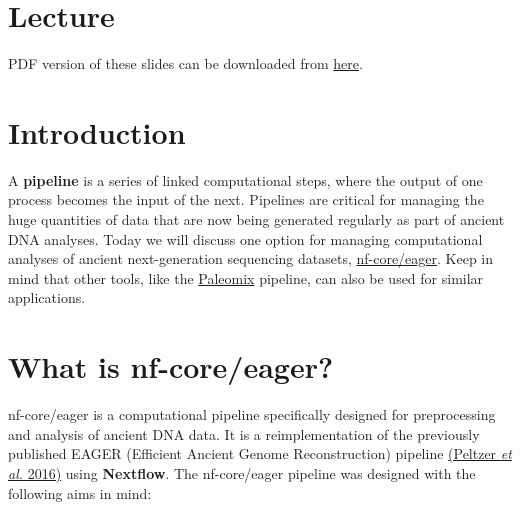 \documentclass[
  letterpaper,
]{book}
\begin{document}
\hypertarget{lecture-15}{%
\section{Lecture}\label{lecture-15}}

PDF version of these slides can be downloaded from
\href{https://github.com/SPAAM-community/https://github.com/SPAAM-community/wss-summer-school/raw/main/docs/raw/main/docs/assets/slides/2022/2d-intro-to-nfcoreeager/SPAAM\%20Summer\%20School\%202022\%20-\%202D\%20-\%20Introduction\%20to\%20nf-core_eager.pdf}{here}.

\hypertarget{introduction-5}{%
\section{Introduction}\label{introduction-5}}

A \textbf{pipeline} is a series of linked computational steps, where the
output of one process becomes the input of the next. Pipelines are
critical for managing the huge quantities of data that are now being
generated regularly as part of ancient DNA analyses. Today we will
discuss one option for managing computational analyses of ancient
next-generation sequencing datasets,
\href{https://nf-co.re/eager}{nf-core/eager}. Keep in mind that other
tools, like the
\href{https://paleomix.readthedocs.io/en/stable/}{Paleomix} pipeline,
can also be used for similar applications.

\hypertarget{what-is-nf-coreeager}{%
\section{What is nf-core/eager?}\label{what-is-nf-coreeager}}

nf-core/eager is a computational pipeline specifically designed for
preprocessing and analysis of ancient DNA data. It is a reimplementation
of the previously published EAGER (Efficient Ancient Genome
Reconstruction) pipeline
\href{https://pubmed.ncbi.nlm.nih.gov/27036623/}{(Peltzer \emph{et al.}
2016)} using \textbf{Nextflow}. The nf-core/eager pipeline was designed
with the following aims in mind:
\end{document}
